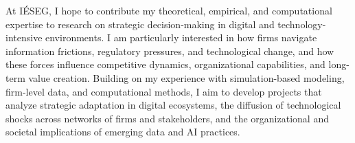 \documentclass{nfr}
\begin{document}
At IÉSEG, I hope to contribute my theoretical, empirical, and computational expertise to research on strategic decision-making in digital and technology-intensive environments. 
I am particularly interested in how firms navigate information frictions, regulatory pressures, and technological change, and how these forces influence competitive dynamics, organizational capabilities, and long-term value creation. 
Building on my experience with simulation-based modeling, firm-level data, and computational methods, I aim to develop projects that analyze strategic adaptation in digital ecosystems, the diffusion of technological shocks across networks of firms and stakeholders, and the organizational and societal implications of emerging data and AI practices. \\
\end{document}
